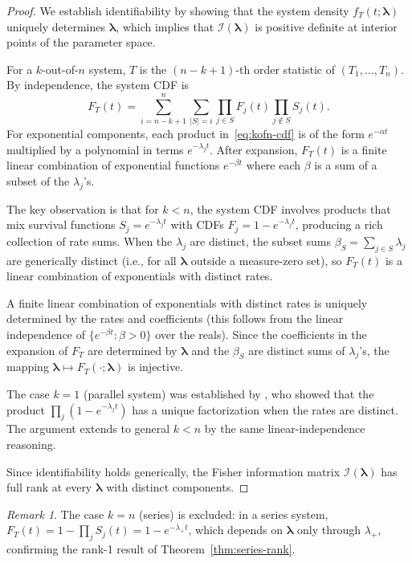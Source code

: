 \documentclass[12pt]{article}
\theoremstyle{definition}
\theoremstyle{remark}
\newtheorem{remark}[theorem]{Remark}
\newcommand{\blam}{\boldsymbol{\lambda}}
\begin{document}
\begin{proof}
We establish identifiability by showing that the system density
$f_T(t; \blam)$ uniquely determines $\blam$, which implies that
$\mathcal{I}(\blam)$ is positive definite at interior points of the
parameter space.

For a $k$-out-of-$n$ system, $T$ is the $(n - k + 1)$-th order
statistic of $(T_1, \ldots, T_n)$.  By independence, the system CDF is
\begin{equation}\label{eq:kofn-cdf}
  F_T(t) = \sum_{i=n-k+1}^{n} \sum_{|S|=i} \prod_{j \in S} F_j(t)
  \prod_{j \notin S} S_j(t).
\end{equation}
For exponential components, each product in~\eqref{eq:kofn-cdf} is of
the form $e^{-\alpha t}$ multiplied by a polynomial in terms
$e^{-\lambda_j t}$.  After expansion, $F_T(t)$ is a finite linear
combination of exponential functions $e^{-\beta t}$ where each $\beta$
is a sum of a subset of the $\lambda_j$'s.

The key observation is that for $k < n$, the system CDF involves
products that mix survival functions $S_j = e^{-\lambda_j t}$ with
CDFs $F_j = 1 - e^{-\lambda_j t}$, producing a rich collection of
rate sums.  When the $\lambda_j$ are distinct, the subset sums
$\beta_S = \sum_{j \in S} \lambda_j$ are generically distinct (i.e.,
for all $\blam$ outside a measure-zero set), so $F_T(t)$ is a linear
combination of exponentials with distinct rates.

A finite linear combination of exponentials with distinct rates is
uniquely determined by the rates and coefficients (this follows from
the linear independence of $\{e^{-\beta t} : \beta > 0\}$ over the
reals).  Since the coefficients in the expansion of $F_T$ are
determined by $\blam$ and the $\beta_S$ are distinct sums of
$\lambda_j$'s, the mapping $\blam \mapsto F_T(\cdot; \blam)$ is
injective.

The case $k = 1$ (parallel system) was established by
\citet{BasuGhosh1980}, who showed that the product
$\prod_j (1 - e^{-\lambda_j t})$ has a unique factorization when
the rates are distinct.  The argument extends to general $k < n$ by
the same linear-independence reasoning.

Since identifiability holds generically, the Fisher information matrix
$\mathcal{I}(\blam)$ has full rank at every $\blam$ with distinct
components.
\end{proof}

\begin{remark}
The case $k = n$ (series) is excluded: in a series system,
$F_T(t) = 1 - \prod_j S_j(t) = 1 - e^{-\lambda_+ t}$, which
depends on $\blam$ only through $\lambda_+$, confirming the rank-1
result of Theorem~\ref{thm:series-rank}.
\end{remark}
\end{document}
